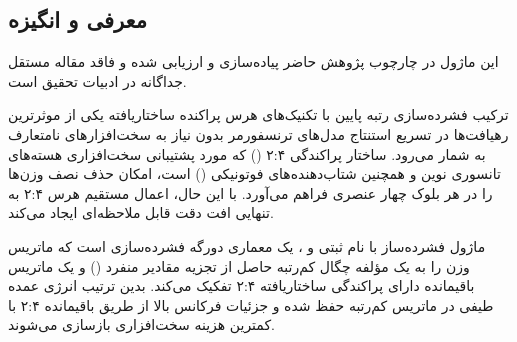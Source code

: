 \subsection{معرفی و انگیزه}
این ماژول در چارچوب پژوهش حاضر پیاده‌سازی و ارزیابی شده و فاقد مقاله مستقل جداگانه در ادبیات تحقیق است.

ترکیب فشرده‌سازی رتبه پایین با تکنیک‌های هرس پراکنده ساختاریافته یکی از موثرترین رهیافت‌ها در تسریع استنتاج مدل‌های ترنسفورمر بدون نیاز به سخت‌افزارهای نامتعارف به شمار می‌رود. ساختار پراکندگی ۲:۴ () که مورد پشتیبانی سخت‌افزاری هسته‌های تانسوری نوین و همچنین شتاب‌دهنده‌های فوتونیکی () است، امکان حذف نصف وزن‌ها را در هر بلوک چهار عنصری فراهم می‌آورد. با این حال، اعمال مستقیم هرس ۲:۴ به تنهایی افت دقت قابل ملاحظه‌ای ایجاد می‌کند.

ماژول فشرده‌ساز  با نام ثبتی  و ، یک معماری دورگه فشرده‌سازی است که ماتریس وزن را به یک مؤلفه چگال کم‌رتبه حاصل از تجزیه مقادیر منفرد () و یک ماتریس باقیمانده دارای پراکندگی ساختاریافته ۲:۴ تفکیک می‌کند. بدین ترتیب انرژی عمده طیفی در ماتریس کم‌رتبه حفظ شده و جزئیات فرکانس بالا از طریق باقیمانده ۲:۴ با کمترین هزینه سخت‌افزاری بازسازی می‌شوند.
